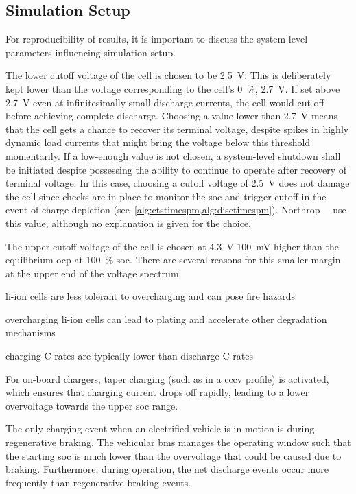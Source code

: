 \subsection{Simulation Setup}

For  reproducibility of  results, it  is important  to discuss  the system-level
parameters influencing simulation setup.

The  lower cutoff  voltage of  the cell  is chosen  to be  \SI{2.5}{\volt}. This
is  deliberately  kept  lower  than  the voltage  corresponding  to  the  cell's
\SI{0}{\percent},  \ie{}  \SI{2.7}{\volt}.  If set  above  \SI{2.7}{\volt}  even
at  infinitesimally small  discharge  currents, the  cell  would cut-off  before
achieving complete discharge. Choosing a value lower than \SI{2.7}{V} means that
the cell gets a chance to recover its terminal voltage, despite spikes in highly
dynamic  load  currents  that  might  bring the  voltage  below  this  threshold
momentarily. If a low-enough value is  not chosen, a system-level shutdown shall
be  initiated  despite possessing  the  ability  to  continue to  operate  after
recovery  of terminal  voltage.  In  this case,  choosing  a  cutoff voltage  of
\SI{2.5}{\volt}  does  not  damage  the  cell  since  checks  are  in  place  to
monitor  the \gls{soc}  and  trigger cutoff  in the  event  of charge  depletion
(see~\cref{alg:ctstimespm,alg:disctimespm}).  Northrop~\etal~\cite{Northrop2011}
use this value, although no explanation is given for the choice.

The  upper  cutoff voltage  of  the  cell  is  chosen at  \SI{4.3}{\volt}  \ie{}
\approx\SI{100}{\milli  \volt}   higher  than   the  equilibrium   \gls{ocp}  at
\SI{100}{\percent} \gls{soc}. There are several  reasons for this smaller margin
at the upper end of the voltage spectrum:
\begin{description}[leftmargin=!,labelwidth=\widthof{\bfseries low
    probabilities},itemsep=1ex]
    \item[safety] li-ion cells are less tolerant to overcharging and can pose fire
        hazards
    \item[degradation] overcharging li-ion cells can lead to plating and
        accelerate other degradation mechanisms
    \item[low C-rates] charging C-rates are typically lower than discharge C-rates
    \item[CCCV charging] For on-board chargers, taper charging (such as in a \gls{cccv} profile) is
        activated, which ensures that charging
        current drops off rapidly, leading to a lower overvoltage towards the upper
        \gls{soc} range.
    \item[low probabilities] The only charging event when an electrified vehicle is in motion is during
        regenerative braking. The vehicular \gls{bms} manages the operating
        window such that the starting \gls{soc} is much lower than the
        overvoltage that could be caused due to braking. Furthermore, during
        operation, the net discharge events occur more frequently than
        regenerative braking events.
\end{description}


